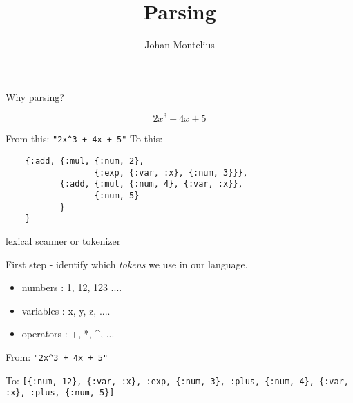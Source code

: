 

\title[ID1019 Parsing]{Parsing}

\author{Johan Montelius}
\date{\semester}



\begin{frame}
\titlepage
\end{frame}

\begin{frame}[fragile]{Why parsing?}

$$2x^3 + 4x + 5$$
\pause 

\hspace{20pt} From this:  {\tt "2x\^{}3 + 4x + 5"}
\pause
\vspace{20pt}
\hspace{20pt} To this:

\begin{verbatim}
    {:add, {:mul, {:num, 2}, 
                  {:exp, {:var, :x}, {:num, 3}}},
           {:add, {:mul, {:num, 4}, {:var, :x}},
                  {:num, 5}
           }
    }
\end{verbatim}

\end{frame}

\begin{frame}[fragile]{lexical scanner or tokenizer}

  \pause
  First step - identify which {\em tokens} we use in our language.

  \pause\vspace{20pt}
  \begin{itemize}
  \item numbers : 1, 12, 123 ....
  \item variables :  x, y, z, ....
  \item operators : +, *, \^{}, ...
  \end{itemize}

  \pause\vspace{20pt}
  
  From: {\tt "2x\^{}3 + 4x + 5"}  \pause

  \pause\vspace{20pt}
  To: {\tt [\{:num, 12\}, \{:var, :x\}, :exp, \{:num, 3\}, :plus, \{:num, 4\}, \{:var, :x\}, :plus, \{:num, 5\}]}
  
\end{frame}

